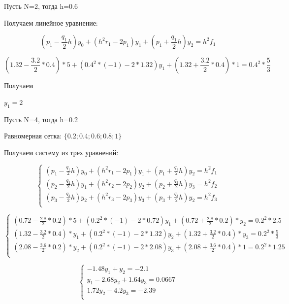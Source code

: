 Пусть N=2, тогда h=0.6

Получаем линейное уравнение: 

\begin{equation}
  (p_{1}-\frac{q_{1}}{2}h)y_{0}+(h^{2}r_{1}-2p_{1})y_{1}+(p_{1}+\frac{q_{1}}{2}h)y_{2}=h^{2}f_{1}
\end{equation}

\begin{equation}
	(1.32-\frac{3.2}{2}*0.4)*5+(0.4^{2}*(-1)-2*1.32)y_{1}+(1.32+\frac{3.2}{2}*0.4)*1=0.4^{2}*\frac{5}{3}
\end{equation}
  
Получаем 

\begin{math}
	y_{1}=2
\end{math}

Пусть N=4, тогда h=0.2 

Равномерная сетка: \begin{math}
	\{0.2;0.4;0.6;0.8;1\}
\end{math}

Получаем систему из трех уравнений: 

\begin{equation}
	\begin{cases}
		(p_{1}-\frac{q_{1}}{2}h)y_{0}+(h^{2}r_{1}-2p_{1})y_{1}+(p_{1}+\frac{q_{1}}{2}h)y_{2}=h^{2}f_{1} \\
		(p_{2}-\frac{q_{2}}{2}h)y_{1}+(h^{2}r_{2}-2p_{2})y_{2}+(p_{2}+\frac{q_{2}}{2}h)y_{3}=h^{2}f_{2} \\
		(p_{3}-\frac{q_{3}}{2}h)y_{2}+(h^{2}r_{3}-2p_{3})y_{3}+(p_{3}+\frac{q_{3}}{2}h)y_{2}=h^{2}f_{3} \\	
	\end{cases}
\end{equation}

\begin{equation}
	\begin{cases}
		(0.72-\frac{2.8}{2}*0.2)*5+(0.2^{2}*(-1)-2*0.72)y_{1}+(0.72+\frac{2.8}{2}*0.2)*y_{2}=0.2^{2}*2.5 \\
		(1.32-\frac{3.2}{2}*0.4)*y_{1}+(0.2^{2}*(-1)-2*1.32)y_{2}+(1.32+\frac{3.2}{2}*0.4)*y_{3}=0.2^{2}*\frac{5}{3} \\
		(2.08-\frac{3.6}{2}*0.2)*y_{2}+(0.2^{2}*(-1)-2*2.08)y_{3}+(2.08+\frac{3.6}{2}*0.4)*1=0.2^{2}*1.25 \\	
	\end{cases}
\end{equation}

\begin{equation}
	\begin{cases}
		 -1.48y_{1}+y_{2}=-2.1 \\
		 y_{1}-2.68y_{2}+1.64y_{3}=0.0667 \\
		 1.72y_{2}-4.2y_{3}=-2.39 \\	
	\end{cases}
\end{equation}

